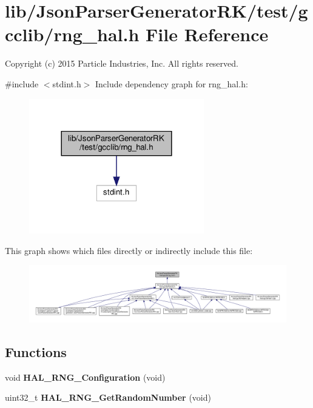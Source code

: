 \section{lib/\+Json\+Parser\+Generator\+R\+K/test/gcclib/rng\+\_\+hal.h File Reference}
\label{rng__hal_8h}


Copyright (c) 2015 Particle Industries, Inc. All rights reserved.  


{\ttfamily \#include $<$stdint.\+h$>$}\newline
Include dependency graph for rng\+\_\+hal.\+h\+:\nopagebreak
\begin{figure}[H]
\begin{center}
\leavevmode
\includegraphics[width=216pt]{rng__hal_8h__incl}
\end{center}
\end{figure}
This graph shows which files directly or indirectly include this file\+:\nopagebreak
\begin{figure}[H]
\begin{center}
\leavevmode
\includegraphics[width=350pt]{rng__hal_8h__dep__incl}
\end{center}
\end{figure}
\subsection*{Functions}
\begin{DoxyCompactItemize}
\item 
void \textbf{ H\+A\+L\+\_\+\+R\+N\+G\+\_\+\+Configuration} (void)
\item 
uint32\+\_\+t \textbf{ H\+A\+L\+\_\+\+R\+N\+G\+\_\+\+Get\+Random\+Number} (void)
\end{DoxyCompactItemize}


